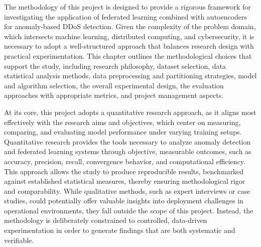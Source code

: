 The methodology of this project is designed to provide a rigorous framework for investigating the application of federated learning combined with autoencoders for anomaly-based DDoS detection. Given the complexity of the problem domain, which intersects machine learning, distributed computing, and cybersecurity, it is necessary to adopt a well-structured approach that balances research design with practical experimentation. This chapter outlines the methodological choices that support the study, including research philosophy, dataset selection, data statistical analysis methods, data preprocessing and partitioning strategies, model and algorithm selection, the overall experimental design, the evaluation approaches with appropriate metrics, and project management aspects.

At its core, this project adopts a quantitative research approach, as it aligns most effectively with the research aims and objectives, which center on measuring, comparing, and evaluating model performance under varying training setups. Quantitative research provides the tools necessary to analyze anomaly detection and federated learning systems through objective, measurable outcomes, such as accuracy, precision, recall, convergence behavior, and computational efficiency. This approach allows the study to produce reproducible results, benchmarked against established statistical measures, thereby ensuring methodological rigor and comparability. While qualitative methods, such as expert interviews or case studies, could potentially offer valuable insights into deployment challenges in operational environments, they fall outside the scope of this project. Instead, the methodology is deliberately constrained to controlled, data-driven experimentation in order to generate findings that are both systematic and verifiable.

